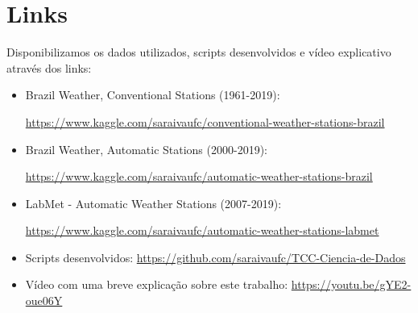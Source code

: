 \chapter{Links}

Disponibilizamos os dados utilizados, scripts desenvolvidos e vídeo explicativo através dos links: 

\begin{itemize}
    \item Brazil Weather, Conventional Stations (1961-2019):
    
    \href{https://www.kaggle.com/saraivaufc/conventional-weather-stations-brazil}{https://www.kaggle.com/saraivaufc/conventional-weather-stations-brazil}
    
    \item Brazil Weather, Automatic Stations (2000-2019):
    
    \href{https://www.kaggle.com/saraivaufc/automatic-weather-stations-brazil}{https://www.kaggle.com/saraivaufc/automatic-weather-stations-brazil}
    
    \item LabMet - Automatic Weather Stations (2007-2019):
    
    \href{https://www.kaggle.com/saraivaufc/automatic-weather-stations-labmet}{https://www.kaggle.com/saraivaufc/automatic-weather-stations-labmet}
    
    \item Scripts desenvolvidos: \href{https://github.com/saraivaufc/TCC-Ciencia-de-Dados}{https://github.com/saraivaufc/TCC-Ciencia-de-Dados}
    
    \item Vídeo com uma breve explicação sobre este trabalho: \href{https://youtu.be/gYE2-oue06Y}{https://youtu.be/gYE2-oue06Y}
\end{itemize}


\newpage